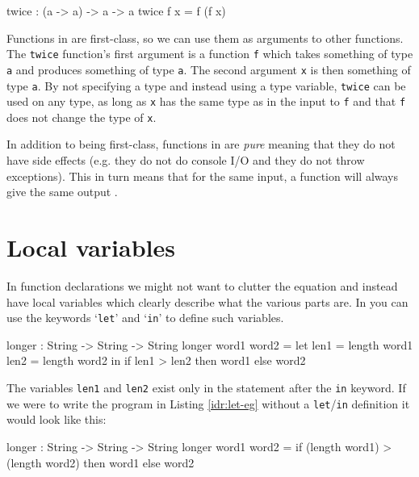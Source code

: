     \begin{code}[caption={A function with a function as an argument}]
        twice : (a -> a) -> a -> a
        twice f x = f (f x)
    \end{code}
    
    Functions in \Idris are first-class, so we can use them as arguments to other functions. The \texttt{twice} function's first argument is a function \texttt{f} which takes something of type \texttt{a} and produces something of type \texttt{a}. The second argument \texttt{x} is then something of type \texttt{a}. By not specifying a type and instead using a type variable, \texttt{twice} can be used on any type, as long as \texttt{x} has the same type as in the input to \texttt{f} and that \texttt{f} does not change the type of \texttt{x}.
    
    In addition to being first-class, functions in \Idris are \textit{pure} meaning that they do not have side effects (e.g. they do not do console I/O and they do not throw exceptions). This in turn means that for the same input, a function will always give the same output \cite{brady_2017}.


\section{Local variables}
    In function declarations we might not want to clutter the equation and instead have local variables which clearly describe what the various parts are. In \Idris you can use the keywords `\texttt{let}' and `\texttt{in}' to define such variables.
    
    \begin{code}[label={idr:let-eg}, caption={A program which returns the longer of two given words}]
        longer : String -> String -> String
        longer word1 word2 =
          let
            len1 = length word1
            len2 = length word2
          in
            if len1 > len2 then word1 else word2
    \end{code}
    
    The variables \texttt{len1} and \texttt{len2} exist only in the statement after the \texttt{in} keyword. If we were to write the program in Listing \ref{idr:let-eg} without a \texttt{let}/\texttt{in} definition it would look like this:
    
    \begin{code}[caption={Listing \ref{idr:let-eg} without using \texttt{let}/\texttt{in}}]
    longer : String -> String -> String
    longer word1 word2 =
      if (length word1) > (length word2) then word1 else word2
    \end{code}

